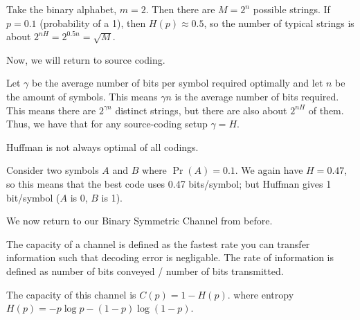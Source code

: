 \begin{example}
    Take the binary alphabet, $m = 2$. Then there are $M = 2^n$ possible strings. If $p = 0.1$ (probability of a 1), then $H(p) \approx 0.5$,
    so the number of typical strings is about $2^{nH} = 2^{0.5n} = \sqrt{M}$.
\end{example}

Now, we will return to source coding.

\begin{theorem}
    Let $\gamma$ be the average number of bits per symbol required optimally and let $n$ be the amount of symbols. This means $\gamma n$ is the average number of bits required.
    This means there are $2^{\gamma n}$ distinct strings, but there are also about $2^{nH}$ of them. Thus, we have that for any source-coding setup $\gamma = H$.
\end{theorem}

Huffman is not always optimal of all codings.
\begin{example}
    Consider two symbols $A$ and $B$ where $\Pr(A) = 0.1$. We again have $H = 0.47$, so this means that the best code uses
    0.47 bits/symbol; but Huffman gives 1 bit/symbol ($A$ is 0, $B$ is 1).
\end{example}

We now return to our Binary Symmetric Channel from before.

\begin{definition}[Capacity]
    The capacity of a channel is defined as the fastest rate you can transfer information such that decoding error is negligable.
    The rate of information is defined as number of bits conveyed / number of bits transmitted.
\end{definition}

\begin{theorem}
    The capacity of this channel is $C(p) = 1 - H(p)$. where entropy $H(p) = -p \log p - (1 - p) \log (1- p)$.
\end{theorem}